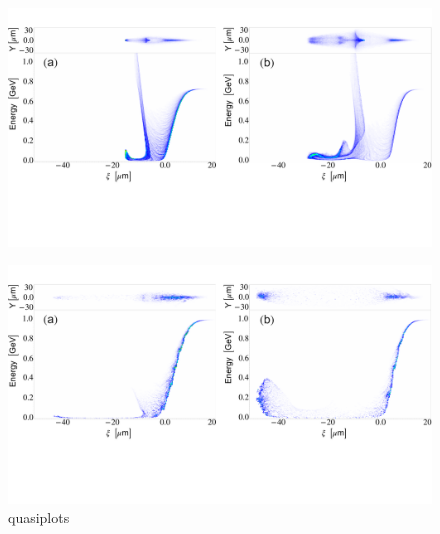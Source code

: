 \begin{figure}
\centering
\includegraphics[width=\textwidth]{linearplots.pdf}
\end{figure}
\begin{figure}
\includegraphics[width=\textwidth]{quasiplots}
\caption{quasiplots}
\end{figure}

